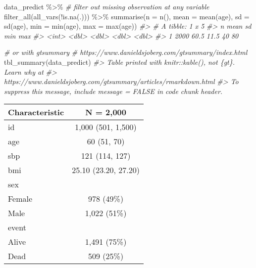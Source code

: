 \documentclass[
]{article}
\newenvironment{Shaded}{\begin{snugshade}}{\end{snugshade}}
\newcommand{\AttributeTok}[1]{\textcolor[rgb]{0.77,0.63,0.00}{#1}}
\newcommand{\CommentTok}[1]{\textcolor[rgb]{0.56,0.35,0.01}{\textit{#1}}}
\newcommand{\FunctionTok}[1]{\textcolor[rgb]{0.00,0.00,0.00}{#1}}
\newcommand{\NormalTok}[1]{#1}
\newcommand{\SpecialCharTok}[1]{\textcolor[rgb]{0.00,0.00,0.00}{#1}}
\begin{document}
\begin{Shaded}
\begin{Highlighting}[]
\NormalTok{data\_predict }\SpecialCharTok{\%\textgreater{}\%} 
  \CommentTok{\# filter out missing observation at any variable}
  \FunctionTok{filter\_all}\NormalTok{(}\FunctionTok{all\_vars}\NormalTok{(}\SpecialCharTok{!}\FunctionTok{is.na}\NormalTok{(.))) }\SpecialCharTok{\%\textgreater{}\%} 
  \FunctionTok{summarise}\NormalTok{(}\AttributeTok{n =} \FunctionTok{n}\NormalTok{(),}
            \AttributeTok{mean =} \FunctionTok{mean}\NormalTok{(age),}
            \AttributeTok{sd =} \FunctionTok{sd}\NormalTok{(age),}
            \AttributeTok{min =} \FunctionTok{min}\NormalTok{(age),}
            \AttributeTok{max =} \FunctionTok{max}\NormalTok{(age))}
\CommentTok{\#\textgreater{} \# A tibble: 1 x 5}
\CommentTok{\#\textgreater{}       n  mean    sd   min   max}
\CommentTok{\#\textgreater{}   \textless{}int\textgreater{} \textless{}dbl\textgreater{} \textless{}dbl\textgreater{} \textless{}dbl\textgreater{} \textless{}dbl\textgreater{}}
\CommentTok{\#\textgreater{} 1  2000  60.5  11.5    40    80}

\CommentTok{\# or with gtsummary }
\CommentTok{\# https://www.danieldsjoberg.com/gtsummary/index.html}
\FunctionTok{tbl\_summary}\NormalTok{(data\_predict)}
\CommentTok{\#\textgreater{} Table printed with \textasciigrave{}knitr::kable()\textasciigrave{}, not \{gt\}. Learn why at}
\CommentTok{\#\textgreater{} https://www.danieldsjoberg.com/gtsummary/articles/rmarkdown.html}
\CommentTok{\#\textgreater{} To suppress this message, include \textasciigrave{}message = FALSE\textasciigrave{} in code chunk header.}
\end{Highlighting}
\end{Shaded}

\begin{longtable}[]{@{}lc@{}}
\toprule()
\textbf{Characteristic} & \textbf{N = 2,000} \\
\midrule()
\endhead
id & 1,000 (501, 1,500) \\
age & 60 (51, 70) \\
sbp & 121 (114, 127) \\
bmi & 25.10 (23.20, 27.20) \\
sex & \\
Female & 978 (49\%) \\
Male & 1,022 (51\%) \\
event & \\
Alive & 1,491 (75\%) \\
Dead & 509 (25\%) \\
\bottomrule()
\end{longtable}
\end{document}
